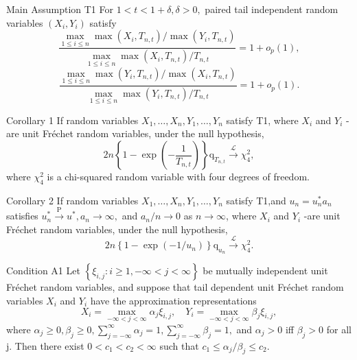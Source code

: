 \documentclass[12pt]{beamer}
\begin{document}
\begin{frame}{Main Assumption T1}
For $1<t<1+\delta,\delta>0,$ paired tail independent random variables $(X_i,Y_i)$ satisfy
$$\frac{\max _{1 \leq i \leq n} \max \left(X_{i}, T_{n, t}\right) / \max \left(Y_{i}, T_{n, t}\right)}{\max _{1 \leq i \leq n} \max \left(X_{i}, T_{n, t}\right) / T_{n, t}}=1+o_{p}(1),$$
\vspace{3ex}
$$\frac{\max _{1 \leq i \leq n} \max \left(Y_{i}, T_{n, t}\right) / \max \left(X_{i}, T_{n, t}\right)}{\max _{1 \leq i \leq n} \max \left(Y_{i}, T_{n, t}\right) / T_{n, t}}=1+o_{p}(1).$$
\end{frame}


\begin{frame}{Corollary 1}
If random variables $X_{1}, \ldots, X_{n}, Y_{1}, \ldots, Y_{n}$ satisfy T1, where $X_{i}$ and $Y_{i}$ -are unit Fréchet random variables, under the null hypothesis, 
$$2 n\left\{1-\exp \left(-\frac{1}{T_{n, t}}\right)\right\} \mathrm{q}_{T_{n, t}} \stackrel{\mathcal{L}}{\rightarrow} \chi_{4}^{2},$$
where $\chi_{4}^{2}$ is a chi-squared random variable with four degrees of freedom.
\end{frame}

\begin{frame}{Corollary 2}
If random variables $X_{1}, \ldots, X_{n}, Y_{1}, \ldots, Y_{n}$ satisfy T1,and
$u_{n}=u_{n}^{*} a_{n}$ satisfies $u_{n}^{*} \stackrel{\mathrm{P}}{\rightarrow} u^{*}, a_{n} \rightarrow \infty,$ and $a_{n} / n \rightarrow 0$ as $n \to \infty$, where $X_{i}$ and $Y_{i}$ -are unit Fréchet random variables, under the null hypothesis, 
$$2 n\left\{1-\exp \left(-1 / u_{n}\right)\right\} \mathrm{q}_{u_{n}} \stackrel{\mathcal{L}}{\rightarrow} \chi_{4}^{2}.$$
\end{frame}


\begin{frame}{Condition A1}
Let $\left\{\xi_{i, j}: i \geq 1,-\infty<j<\infty\right\}$ be mutually independent unit Fréchet random variables, and suppose that tail dependent unit Fréchet random variables $X_i$ and $Y_i$ have the approximation representations
$$X_{i}=\max _{-\infty<j<\infty} \alpha_{j} \xi_{i, j}, \quad Y_{i}=\max _{-\infty<j<\infty} \beta_{j} \xi_{i, j},$$
where $\alpha_{j} \geq 0, \beta_{j} \geq 0, \sum_{j=-\infty}^{\infty} \alpha_{j}=1, \sum_{j=-\infty}^{\infty} \beta_{j}=1,$ and $\alpha_{j}>0$ iff $\beta_{j}>0$ for all j. Then there exist 
$0<c_1<c_2<\infty$ such that $c_1\le \alpha_j/\beta_j \le c_2$.
\end{frame}
\end{document}
